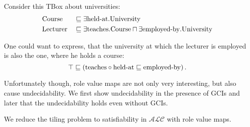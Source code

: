\begin{example}
	Consider this TBox about universities:
	\begin{alignat*}{2}
		& \var{Course} &&\sqsubseteq \exists \var{held-at}.\var{University} \\
		& \var{Lecturer} &&\sqsubseteq \exists \var{teaches}.\var{Course} \sqcap \exists \var{employed-by}.\var{University}
	\end{alignat*}

	One could want to express, that the university at which the lecturer is employed is also the one, where he holds a course:
	\[
		\top \sqsubseteq \left( \var{teaches} \circ \var{held-at} \sqsubseteq \var{employed-by} \right)
	.\]
\end{example}
Unfortunately though, role value maps are not only very interesting, but also cause undecidability.
We first show undecidability in the presence of GCIs and later that the undecidability holds even without GCIs.

We reduce the tiling problem to satisfiability in $\mathcal{ALC}$ with role value maps.

